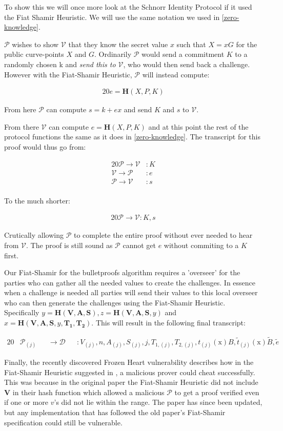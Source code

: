 \documentclass{article}
\newcommand{\eq}[1]{\begin{alignat*}{20}#1\end{alignat*}}
\renewcommand{\vec}[1]{\boldsymbol{#1}}
\newcommand{\ran}[1]{\mathrm{#1}}
\newcommand{\V}{\mathcal{V}}
\renewcommand{\P}{\mathcal{P}}
\newcommand{\D}{\mathcal{D}}
\newcommand{\tB}{\widetilde{B}}
\renewcommand{\tt}{\widetilde{t}}
\begin{document}
To show this we will once more look at the Schnorr Identity Protocol
if it used the Fiat Shamir Heuristic. We will use the same notation
we used in \ref{zero-knowledge}.

$\P$ wishes to show $\V$ that they know the secret value $x$ such that
$X = xG$ for the public curve-points $X$ and $G$. Ordinarily $\P$
would send a commitment $K$ to a randomly chosen k and \textit{send
this to $\V$}, who would then send back a challenge. However with the
Fiat-Shamir Heuristic, $\P$ will instead compute:

\eq{
	e = \textbf{H}(X,P,K)
}

From here $\P$ can compute $s = k + ex$ and send $K$ and $s$ to $\V$.

From there $\V$ can compute $e = \textbf{H}(X,P,K)$ and at this
point the rest of the protocol functions the same as it does in
\ref{zero-knowledge}. The transcript for this proof would thus go from:

\eq{
	\P \rightarrow \V &: K \\
	\V \rightarrow \P &: e \\
	\P \rightarrow \V &: s \\
}

To the much shorter:

\eq{
	\P \rightarrow \V: K, s
}

Crutically allowing $\P$ to complete the entire proof without ever
needed to hear from $\V$. The proof is still sound as $\P$ cannot get
$e$ without commiting to a $K$ first.

Our Fiat-Shamir for the bulletproofs algorithm requires a
'overseer' for the parties who can gather all the needed values
to create the challenges. In essence when a challenge is needed
all parties will send their values to this local overseer
who can then generate the challenges using the Fiat-Shamir
Heuristic. Specifically $y = \textbf{H}(\vec{V},\vec{A},\vec{S}),
z = \textbf{H}(\vec{V},\vec{A},\vec{S}, y)$ and $x =
\textbf{H}(\vec{V},\vec{A},\vec{S}, y, \vec{T_1},\vec{T_2})$. This
will result in the following final transcript:

\eq{
	&\P_{(j)} &&\rightarrow \D &&: V_{(j)}, n, A_{(j)}, S_{(j)}, j, T_{1, (j)}, T_{2,(j)}, t_{(j)}(\ran{x})B, \tt_{(j)}(\ran{x})\tB, \widetilde{e}
}

Finally, the recently discovered Frozen Heart vulnerability
\cite{frozen-heart} describes how in the Fiat-Shamir Heuristic suggested
in \cite{bulletproofs}, a malicious prover could cheat
successfully. This was because in the original paper the Fiat-Shamir
Heuristic did not include $\vec{V}$ in their hash function which
allowed a malicious $\P$ to get a proof verified even if one or more
$v$'s did not lie within the range. The paper has since been updated,
but any implementation that has followed the old paper's Fiat-Shamir
specification could still be vulnerable.
\end{document}
